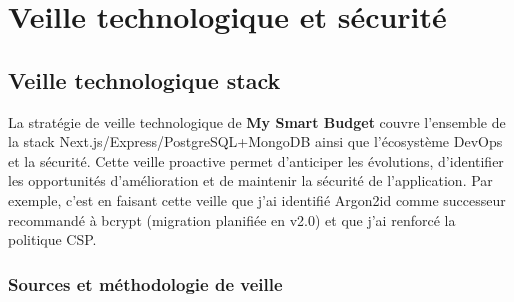 \chapter{Veille technologique et sécurité}

\section{Veille technologique stack}

La stratégie de veille technologique de \textbf{My Smart Budget} couvre l'ensemble de la stack Next.js/Express/PostgreSQL+MongoDB ainsi que l'écosystème DevOps et la sécurité. Cette veille proactive permet d'anticiper les évolutions, d'identifier les opportunités d'amélioration et de maintenir la sécurité de l'application. Par exemple, c'est en faisant cette veille que j'ai identifié Argon2id comme successeur recommandé à bcrypt (migration planifiée en v2.0) et que j'ai renforcé la politique CSP.

\subsection{Sources et méthodologie de veille}

